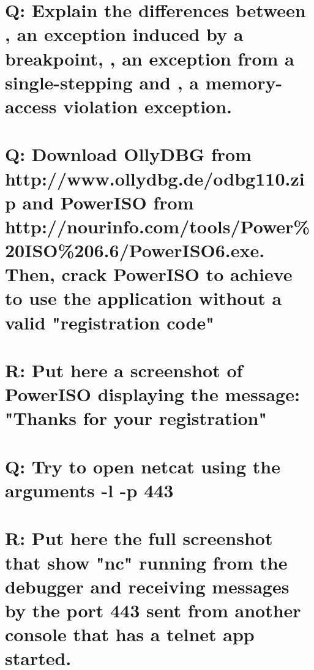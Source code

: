 \documentclass[10pt,a4paper]{article} %
\begin{document}
    \section{Q: Explain the differences between , an exception induced by a
    breakpoint, , an exception from a single-stepping and , a
    memory-access violation exception.}




    \section{Q: Download OllyDBG from http://www.ollydbg.de/odbg110.zip and
    PowerISO from
    http://nourinfo.com/tools/Power\%20ISO\%206.6/PowerISO6.exe. Then, crack
    PowerISO to achieve to use the application without a valid "registration
    code"}




    \section{R: Put here a screenshot of PowerISO displaying the message:
    "Thanks for your registration"}




    \section{Q: Try to open netcat using the arguments -l -p 443}




    \section{R: Put here the full screenshot that show "nc" running from the
    debugger and receiving messages by the port 443 sent from another console
    that has a telnet app started.}



\end{document}
